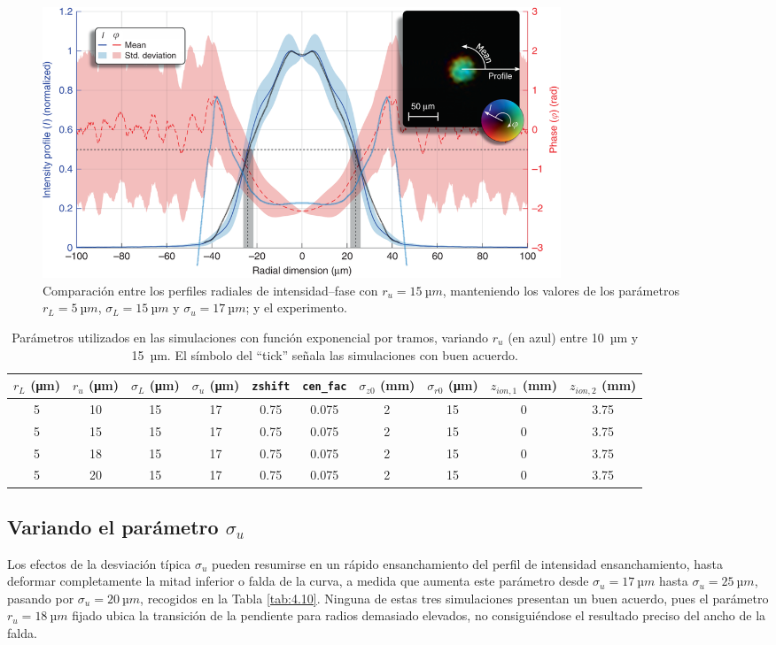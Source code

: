 \begin{figure}[htbp]
  \centering
  \includegraphics[width=0.75\textwidth]{Figuras/ch4_cmp72.png}
  \caption{Comparación entre los perfiles radiales de intensidad--fase con $r_{u}=\qty{15}{µm}$, manteniendo los valores de los parámetros $r_{L}=\qty{5}{µm}$, $\sigma_{L}=\qty{15}{µm}$ y $\sigma_{u}=\qty{17}{µm}$; y el experimento.}
  \label{fig:4.31}
\end{figure}

\begin{table}[htpb]
  \centering
  \scriptsize
  \caption{Parámetros utilizados en las simulaciones con función exponencial por tramos, variando $r_{u}$ (en azul) entre \qty{10}{µm} y \qty{15}{µm}. El símbolo del \enquote{tick} señala las simulaciones con buen acuerdo.}
  \label{tab:4.9}
  \begin{tabular}{S>{\color{miazul}}SSSSSSSSS}
  \toprule
  {$r_{L}$ (\unit{\um})} & {$r_{u}$ (\unit{\um})} & {$\sigma_{L}$ (\unit{\um})} & {$\sigma_{u}$ (\unit{\um})} & {\texttt{zshift}} & {\texttt{cen\_fac}} & {$\sigma_{z0}$ (\unit{mm})} & {$\sigma_{r0}$ (\unit{\um})} & {$z_{ion,1}$ (\unit{mm})} & {$z_{ion,2}$ (\unit{mm})} \\ 
    & 10  & 15 & 17  & 0.75  & 0.075  & 2  & 15  & 0  & 3.75  \\
  5  & 15  & 15 & 17  & 0.75  & 0.075  & 2  & 15  & 0  & 3.75  \\
  5  & 18  & 15 & 17  & 0.75  & 0.075  & 2  & 15  & 0  & 3.75  \\
  5  & 20  & 15 & 17  & 0.75  & 0.075  & 2  & 15  & 0  & 3.75  \\
  \bottomrule
  \end{tabular}
\end{table}

\subsection{Variando el parámetro \texorpdfstring{$\sigma_{u}$}{sigma-u}}\label{sec:4.3.2}
Los efectos de la desviación típica $\sigma_{u}$ pueden resumirse en un rápido ensanchamiento del perfil de intensidad ensanchamiento, hasta deformar completamente la mitad inferior o falda de la curva, a medida que aumenta este parámetro desde $\sigma_{u}=\qty{17}{µm}$ hasta $\sigma_{u}=\qty{25}{µm}$, pasando por $\sigma_{u}=\qty{20}{µm}$, recogidos en la Tabla \ref{tab:4.10}. Ninguna de estas tres simulaciones presentan un buen acuerdo, pues el parámetro $r_{u}=\qty{18}{µm}$ fijado ubica la transición de la pendiente para radios demasiado elevados, no consiguiéndose el resultado preciso del ancho de la falda.

